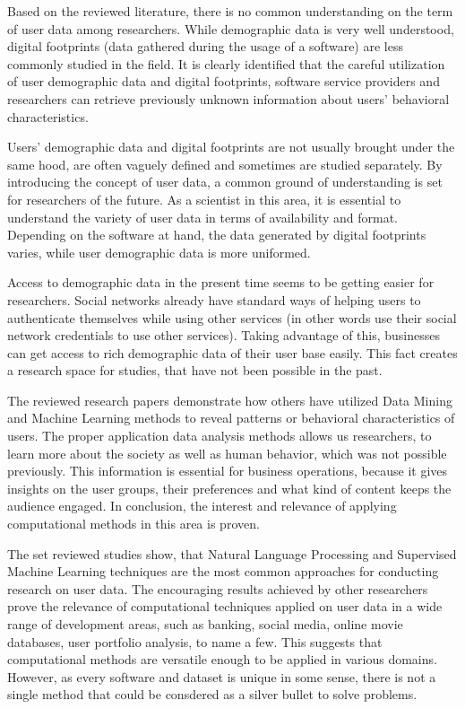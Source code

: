 Based on the reviewed literature, there is no common understanding on the term of user data among researchers. While demographic data is very well understood, digital footprints (data gathered during the usage of a software) are less commonly studied in the field. It is clearly identified that the careful utilization of user demographic data and digital footprints, software service providers and researchers can retrieve previously unknown information about users' behavioral characteristics. 

Users' demographic data and digital footprints are not usually brought under the same hood, are often vaguely defined and sometimes are studied separately. By introducing the concept of user data, a common ground of understanding is set for researchers of the future. As a scientist in this area, it is essential to understand the variety of user data in terms of availability and format. Depending on the software at hand, the data generated by digital footprints varies, while user demographic data is more uniformed.

Access to demographic data in the present time seems to be getting easier for researchers. Social networks already have standard ways of helping users to authenticate themselves while using other services (in other words use their social network credentials to use other services). Taking advantage of this, businesses can get access to rich demographic data of their user base easily. This fact creates a research space for studies, that have not been possible in the past. 

The reviewed research papers demonstrate how others have utilized Data Mining and Machine Learning methods to reveal patterns or behavioral characteristics of users. The proper application data analysis methods allows us researchers, to learn more about the society as well as human behavior, which was not possible previously. This information is essential for business operations, because it gives insights on the user groups, their preferences and what kind of content keeps the audience engaged. In conclusion, the interest and relevance of applying computational methods in this area is proven.

The set reviewed studies show, that Natural Language Processing and Supervised Machine Learning techniques are the most common approaches for conducting research on user data. The encouraging results achieved by other researchers prove the relevance of computational techniques applied on user data in a wide range of development areas, such as banking, social media, online movie databases, user portfolio analysis, to name a few. This suggests that computational methods are versatile enough to be applied in various domains. However, as every software and dataset is unique in some sense, there is not a single method that could be consdered as a silver bullet to solve problems. 

